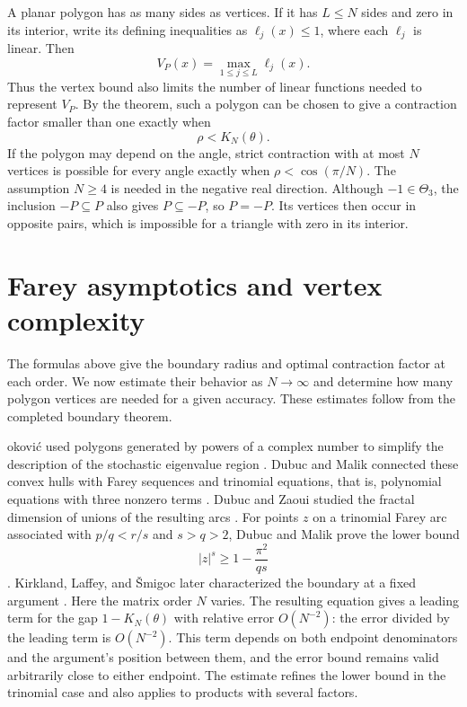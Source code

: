 \documentclass[11pt,a4paper]{article}
\theoremstyle{definition}
\theoremstyle{remark}
\numberwithin{equation}{section}
\begin{document}
A planar polygon has as many sides as vertices. If it has $L\le N$ sides and zero in its interior, write its defining inequalities as $\ell_j(x)\le1$, where each $\ell_j$ is linear. Then
\[
 V_P(x)=\max_{1\le j\le L}\ell_j(x).
\]
Thus the vertex bound also limits the number of linear functions needed to represent $V_P$. By the theorem, such a polygon can be chosen to give a contraction factor smaller than one exactly when
\[
 \rho<K_N(\theta).
\]
If the polygon may depend on the angle, strict contraction with at most $N$ vertices is possible for every angle exactly when $\rho<\cos(\pi/N)$.
The assumption $N\ge4$ is needed in the negative real direction. Although $-1\in\Theta_3$, the inclusion $-P\subseteq P$ also gives $P\subseteq-P$, so $P=-P$. Its vertices then occur in opposite pairs, which is impossible for a triangle with zero in its interior.

\section{Farey asymptotics and vertex complexity}
\label{sec:asymptotic}

The formulas above give the boundary radius and optimal contraction factor at each order. We now estimate their behavior as $N\to\infty$ and determine how many polygon vertices are needed for a given accuracy. These estimates follow from the completed boundary theorem.

\DJ okovi\'c used polygons generated by powers of a complex number to simplify the description of the stochastic eigenvalue region \cite{Djokovic}. Dubuc and Malik connected these convex hulls with Farey sequences and trinomial equations, that is, polynomial equations with three nonzero terms \cite{DubucMalik}. Dubuc and Zaoui studied the fractal dimension of unions of the resulting arcs \cite{DubucZaoui}. For points $z$ on a trinomial Farey arc associated with $p/q<r/s$ and $s>q>2$, Dubuc and Malik prove the lower bound
\[
 |z|^s\ge1-\frac{\pi^2}{qs}
\]
\cite[Theorem~13.1]{DubucMalik}. Kirkland, Laffey, and \v{S}migoc later characterized the boundary at a fixed argument \cite{KirklandLaffeySmigoc}. Here the matrix order $N$ varies. The resulting equation gives a leading term for the gap $1-K_N(\theta)$ with relative error $O(N^{-2})$: the error divided by the leading term is $O(N^{-2})$. This term depends on both endpoint denominators and the argument's position between them, and the error bound remains valid arbitrarily close to either endpoint. The estimate refines the lower bound in the trinomial case and also applies to products with several factors.
\end{document}
